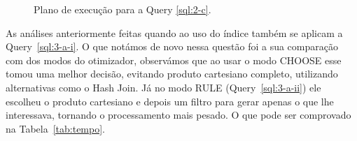\documentclass[a4paper,12pt]{article}
\begin{document}
\begin{figure}[hpt]
   \begin{center}
      \ContinuedFloat
   \end{center}
   \caption{Plano de execução para a Query \ref{sql:2-c}.}
\end{figure}

As análises anteriormente feitas quando ao uso do índice também se aplicam
a Query~\ref{sql:3-a-i}. O que notámos de novo nessa questão foi a sua comparação
com dos modos do otimizador, observámos que ao usar o modo CHOOSE esse tomou uma
melhor decisão, evitando produto cartesiano completo, utilizando alternativas
como o Hash Join. Já no modo RULE (Query~\ref{sql:3-a-ii}) ele escolheu o produto
cartesiano e depois um filtro para gerar apenas o que lhe interessava, tornando
o processamento mais pesado. O que pode ser comprovado na Tabela~\ref{tab:tempo}.

\begin{program}
   
   \caption{Pergunta 3 baseada em ``not in'' com otimizador no modo CHOOSE.}
   \label{sql:3-a-i}
\end{program}
\end{document}
